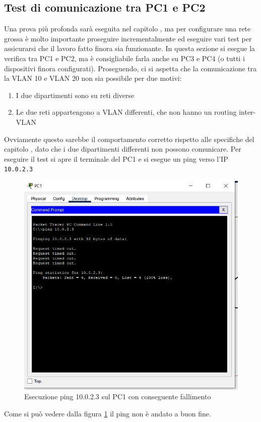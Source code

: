 \documentclass[a4paper,12pt]{report}
\begin{document}
\subsection{Test di comunicazione tra PC1 e PC2}
Una prova più profonda sarà eseguita nel capitolo , ma per configurare una rete grossa è molto importante proseguire incrementalmente ed eseguire vari test per assicurarsi che il lavoro fatto finora sia funzionante.
In questa sezione si esegue la verifica tra PC1 e PC2, ma è consigliabile farla anche su PC3 e PC4 (o tutti i dispositivi finora configurati).
Proseguendo, ci si aspetta che la comunicazione tra la VLAN 10 e VLAN 20 non sia possibile per due motivi:
\begin{enumerate}
    \item I due dipartimenti sono su reti diverse
    \item Le due reti appartengono a VLAN differenti, che non hanno un routing inter-VLAN
\end{enumerate}
Ovviamente questo sarebbe il comportamento corretto rispetto alle specifiche del capitolo , dato che i due dipartimenti differenti non possono comunicare.
%
Per eseguire il test si apre il terminale del PC1 e si esegue un ping verso l'IP \texttt{10.0.2.3}
\begin{figure}
\includegraphics[]{pc1_test_vlan_differenti.png}
\caption{Esecuzione ping 10.0.2.3 sul PC1 con conseguente fallimento}
\label{fig:pc1_test_vlan_differenti}
\end{figure}
Come si può vedere dalla figura \ref{fig:pc1_test_vlan_differenti} il ping non è andato a buon fine.
\end{document}

